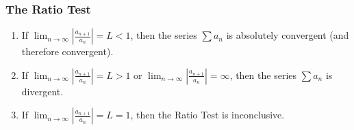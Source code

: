 \begin{frame}
\frametitle{The Ratio Test}
\begin{theorem}
\begin{enumerate}
\item  If $\displaystyle \lim_{n\to\infty} \left| \frac{a_{n+1}}{a_n}\right| = L < 1$, then the series $\sum a_n$ is absolutely convergent (and therefore convergent).
\item  If $\displaystyle \lim_{n\to\infty} \left| \frac{a_{n+1}}{a_n}\right| = L > 1$ or $\displaystyle \lim_{n\to\infty} \left| \frac{a_{n+1}}{a_n}\right| = \infty$, then the series $\sum a_n$ is divergent.
\item  If $\displaystyle \lim_{n\to\infty} \left| \frac{a_{n+1}}{a_n}\right| = L = 1$, then the Ratio Test is inconclusive.
\end{enumerate}
\end{theorem}
\end{frame}
